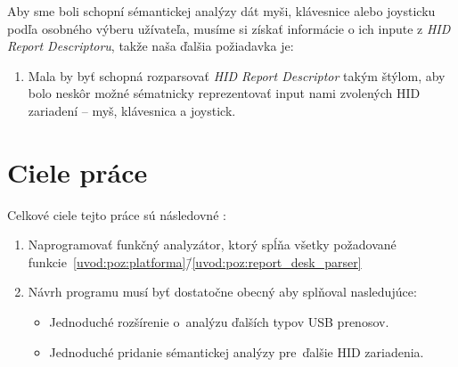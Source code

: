 Aby sme boli schopní sémantickej analýzy dát myši, klávesnice alebo joysticku podľa osobného výberu užívateľa, musíme si získať informácie o ich inpute z \textit{HID Report Descriptoru}, takže naša ďalšia požiadavka je:
\begin{enumerate}[label=\textbf{P\arabic*},resume]
	\item \label{uvod:poz:report_desk_parser} Mala by byť schopná rozparsovať \textit{HID Report Descriptor} takým štýlom, aby bolo neskôr možné sématnicky reprezentovať input nami zvolených HID zariadení -- myš, klávesnica a joystick.
\end{enumerate}

\section{Ciele práce}
\label{uvod:sec:ciele_prace}

Celkové ciele tejto práce sú následovné :

\begin{enumerate}[label=\textbf{C\arabic*}]
	\item \label{uvod:ciel:aplikacia} Naprogramovať funkčný analyzátor, ktorý spĺňa všetky požadované funkcie~\ref{uvod:poz:platforma}\=/\ref{uvod:poz:report_desk_parser}
	\item \label{uvod:ciel:rozsiritelnost} Návrh programu musí byť dostatočne obecný aby splňoval nasledujúce:
	\begin{itemize}
		\item \label{uvod:ciel:roz_USB} Jednoduché rozšírenie o~analýzu ďalších typov USB prenosov.
		\item \label{uvod:ciel:roz_HID} Jednoduché pridanie sémantickej analýzy pre~ďalšie HID zariadenia.
	\end{itemize}
\end{enumerate}